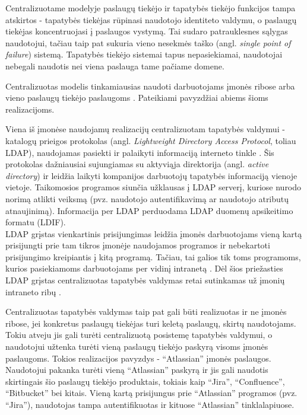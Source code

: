 Centralizuotame modelyje paslaugų tiekėjo ir tapatybės tiekėjo funkcijos tampa atskirtos - 
tapatybės tiekėjas rūpinasi naudotojo identiteto valdymu, o paslaugų tiekėjas koncentruojasi į paslaugos vystymą. Tai sudaro patrauklesnes sąlygas
naudotojui, tačiau taip pat sukuria vieno nesekmės taško (angl. \textit{single point of failure}) sistemą. Tapatybės tiekėjo sistemai tapus nepasiekiamai,
naudotojai nebegali naudotis nei viena paslauga tame pačiame domene.


Centralizuotas modelis tinkamiausias naudoti darbuotojams įmonės ribose arba vieno paslaugų tiekėjo paslaugoms \cite{Josang2005}.
Pateikiami pavyzdžiai abiems šioms realizacijoms. 

Viena iš įmonėse naudojamų realizacijų centralizuotam tapatybės valdymui - 
katalogų prieigos protokolas (angl. \textit{Lightweight Directory Access Protocol}, toliau LDAP), naudojamas pasiekti ir palaikyti informaciją interneto tinkle \cite{Strictest2011}.
Šis protokolas dažniausiai sujungiamas su aktyviąja direktorija (angl. \textit{active directory}) ir leidžia laikyti kompanijos darbuotojų
tapatybės informaciją vienoje vietoje. Taikomosios programos siunčia užklausas į LDAP serverį, kuriose nurodo norimą atlikti veiksmą (pvz. naudotojo
autentifikavimą ar naudotojo atributų atnaujinimą). Informacija per LDAP perduodama LDAP duomenų apsikeitimo formatu (LDIF).\\
LDAP grįstas vienkartinis prisijungimas leidžia įmonės darbuotojams vieną kartą prisijungti prie tam tikros įmonėje naudojamos programos ir
nebekartoti prisijungimo kreipiantis į kitą programą. Tačiau, tai galios tik toms programoms, kurios pasiekiamoms darbuotojams per vidinį intranetą
\cite{Strictest2011}. Dėl šios priežasties LDAP grįstas centralizuotas tapatybės valdymas retai sutinkamas už įmonių intraneto ribų \cite{Strictest2011}.

Centralizuotas tapatybės valdymas taip pat gali būti realizuotas ir ne įmonės ribose, jei konkretus paslaugų tiekėjas
turi keletą paslaugų, skirtų naudotojams. Tokiu atveju jis gali turėti centralizuotą posistemę tapatybės valdymui, o naudotojui užtenka
turėti vieną paslaugų tiekėjo paskyrą visoms įmonės paslaugoms. Tokios realizacijos pavyzdys - \enquote{Atlassian} įmonės paslaugos. Naudotojui pakanka turėti vieną \enquote{Atlassian} paskyrą ir jis gali naudotis
skirtingais šio paslaugų tiekėjo produktais, tokiais kaip \enquote{Jira}, \enquote{Confluence}, \enquote{Bitbucket} bei kitais. Vieną kartą prisijungus prie \enquote{Atlassian} programos (pvz. \enquote{Jira}),
naudotojas tampa autentifikuotas ir kituose \enquote{Atlassian} tinklalapiuose. 


